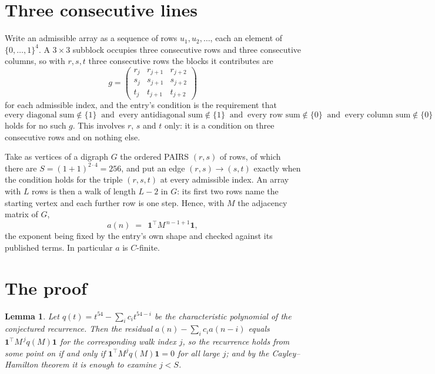\documentclass[11pt,a4paper]{article}
\theoremstyle{plain}
\newtheorem{lemma}[theorem]{Lemma}
\theoremstyle{definition}
\begin{document}
\section{Three consecutive lines}

Write an admissible array as a sequence of rows $u_1,u_2,\dots$, each an element of
$\{0,\dots,1\}^{4}$. A $3\times3$ subblock occupies three consecutive rows and
three consecutive columns, so with $r,s,t$ three consecutive rows the blocks it
contributes are
\[
g=\begin{pmatrix}r_j&r_{j+1}&r_{j+2}\\ s_j&s_{j+1}&s_{j+2}\\ t_j&t_{j+1}&t_{j+2}\end{pmatrix}
\]
for each admissible index, and the entry's condition is the requirement that
\[
\text{every diagonal sum} \notin \{1\}\ \text{ and }\ \text{every antidiagonal sum} \notin \{1\}\ \text{ and }\ \text{every row sum} \notin \{0\}\ \text{ and }\ \text{every column sum} \notin \{0\}
\]
holds for no such $g$. This involves $r$, $s$ and $t$ only: it is a condition on
three consecutive rows and on nothing else.

Take as vertices of a digraph $G$ the ordered PAIRS $(r,s)$ of rows, of which there are
$S=(1+1)^{2\cdot4}=256$, and put an edge $(r,s)\to(s,t)$ exactly when the condition
holds for the triple $(r,s,t)$ at every admissible index. An array with $L$ rows is then a
walk of length $L-2$ in $G$: its first two rows name the starting vertex and each further
row is one step. Hence, with $M$ the adjacency matrix of $G$,
\[
a(n)\;=\;\,\mathbf{1}^{\!\top}M^{\,n-1+1}\mathbf{1},
\]
the exponent being fixed by the entry's own shape and checked against its published terms.
In particular $a$ is $C$-finite.

\section{The proof}

\begin{lemma}\label{lem:crit}
Let $q(t)=t^{54}-\sum_i c_it^{54-i}$ be the characteristic polynomial of the
conjectured recurrence. Then the residual $a(n)-\sum_ic_ia(n-i)$ equals
$\mathbf{1}^{\!\top}M^{\,j}q(M)\mathbf{1}$ for the corresponding walk index
$j$, so the recurrence holds from some point on if and only if
$\mathbf{1}^{\!\top}M^{j}q(M)\mathbf{1}=0$ for all large $j$; and by the
Cayley--Hamilton theorem it is enough to examine $j<S$.
\end{lemma}
\end{document}

